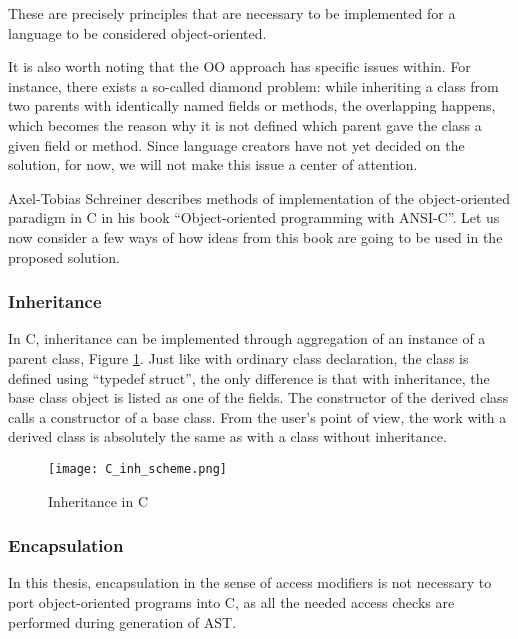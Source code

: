 These are precisely principles that are necessary to be implemented for a language to be considered object-oriented.

It is also worth noting that the OO approach has specific issues within. For instance, there exists a so-called diamond problem: while inheriting a class from two parents with identically named fields or methods, the overlapping happens, which becomes the reason why it is not defined which parent gave the class a given field or method. Since language creators have not yet decided on the solution, for now, we will not make this issue a center of attention.

Axel-Tobias Schreiner describes methods of implementation of the object-oriented paradigm in C in his book ``Object-oriented programming with \mbox{ANSI-C}''\cite{Schreiner2011}. 
Let us now consider a few ways of how ideas from this book are going to be used in the proposed solution.

\subsubsection{Inheritance}
In C, inheritance can be implemented through aggregation of an instance of a parent class, Figure \ref{fig:C_inh_scheme}. Just like with ordinary class declaration, the class is defined using ``typedef struct'', the only difference is that with inheritance, the base class object is listed as one of the fields. The constructor of the derived class calls a constructor of a base class. From the user’s point of view, the work with a derived class is absolutely the same as with a class without inheritance.

\begin{figure}[h!]
    \centering
    \texttt{[image: C\_inh\_scheme.png]}
    \caption{Inheritance in C}
    \label{fig:C_inh_scheme}
\end{figure}

\subsubsection{Encapsulation}
In this thesis, encapsulation in the sense of access modifiers is not necessary to port object-oriented programs into C, as all the needed access checks are performed during generation of AST.

